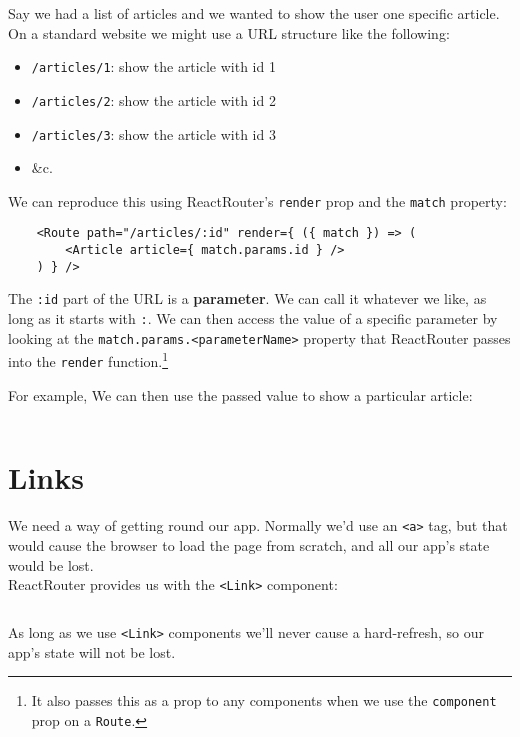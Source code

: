 Say we had a list of articles and we wanted to show the user one specific article. On a standard website we might use a URL structure like the following:

\begin{itemize}
    \item \texttt{/articles/1}: show the article with id 1
    \item \texttt{/articles/2}: show the article with id 2
    \item \texttt{/articles/3}: show the article with id 3
    \item \&c.
\end{itemize}

We can reproduce this using ReactRouter's \texttt{render} prop and the \texttt{match} property:

\begin{verbatim}
    <Route path="/articles/:id" render={ ({ match }) => (
        <Article article={ match.params.id } />
    ) } />
\end{verbatim}

The \texttt{:id} part of the URL is a \textbf{parameter}. We can call it whatever we like, as long as it starts with \texttt{:}. We can then access the value of a specific parameter by looking at the \texttt{match.params.<parameterName>} property that ReactRouter passes into the \texttt{render} function.\footnote{It also passes this as a prop to any components when we use the \texttt{component} prop on a \texttt{Route}.}


\pagebreak


For example, We can then use the passed value to show a particular article:

\inputminted{jsx}{04/figures/01/03-Article.jsx}



\section{Links}

We need a way of getting round our app. Normally we'd use an \texttt{<a>} tag, but that would cause the browser to load the page from scratch, and all our app's state would be lost.
\\

ReactRouter provides us with the \texttt{<Link>} component:

\inputminted{jsx}{04/figures/01/04-Link.jsx}

As long as we use \texttt{<Link>} components we'll never cause a hard-refresh, so our app's state will not be lost.
\\

